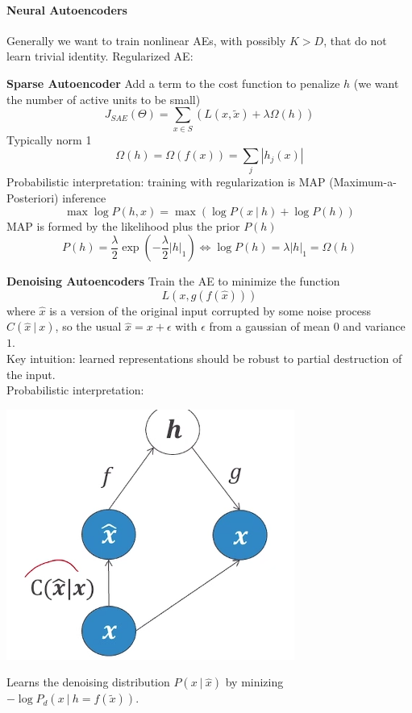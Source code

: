 \documentclass[10pt]{report}
\begin{document}
\paragraph{Neural Autoencoders} Generally we want to train nonlinear AEs, 
with possibly $K > D$, that do not learn trivial identity. Regularized AE:
\begin{list}{}{}
	\item \textbf{Sparse Autoencoder} Add a term to the cost function to penalize $h$ (we want the number of active units to be small)
$$J_{SAE}(\Theta) = \sum_{x\in S} (L(x, \tilde{x}) + \lambda\Omega(h))$$
Typically norm 1
$$\Omega(h) = \Omega(f(x)) = \sum_j|h_j(x)|$$
Probabilistic interpretation: training with regularization is MAP (Maximum-a-Posteriori) inference
$$\max\log P(h,x)=\max(\log P(x\:|\:h)+\log P(h))$$
MAP is formed by the likelihood plus the prior $P(h)$
$$P(h)=\frac{\lambda}{2}\exp\left(-\frac{\lambda}{2}|h|_1\right) \Leftrightarrow \log P(h) = \lambda|h|_1 = \Omega(h)$$
	\item \textbf{Denoising Autoencoders} Train the AE to minimize the function $$L(x,g(f(\hat{x})))$$
where $\hat{x}$ is a version of the original input corrupted by some noise process $C(\hat{x}\:|\:x)$, so the usual $\hat{x} = x + \epsilon$ with $\epsilon$ from a gaussian of mean $0$ and variance $1$.\\
Key intuition: learned representations should be robust to partial destruction of the input.\\
Probabilistic interpretation:\begin{center}
	\includegraphics[scale=0.5]{76.png}
\end{center}
Learns the denoising distribution $P(x\:|\:\hat{x})$ by minizing $-\log P_d(x\:|\:h=f(\tilde{x}))$.\\

\end{list}
\end{document}
